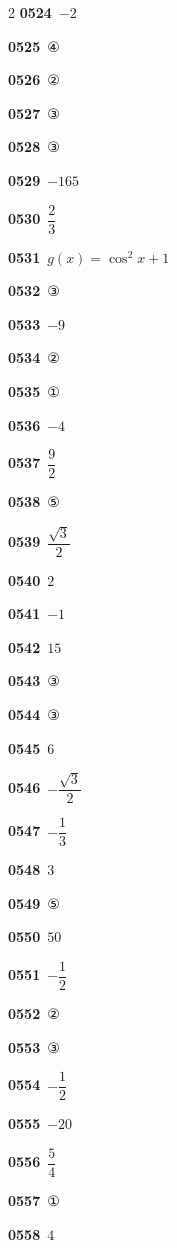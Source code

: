 \documentclass[10pt,a4paper]{article}
\begin{document}
\begin{multicols}{2}
\noindent\textbf{0524}\ $-2$\par
\noindent\textbf{0525}\ ④\par
\noindent\textbf{0526}\ ②\par
\noindent\textbf{0527}\ ③\par
\noindent\textbf{0528}\ ③\par
\noindent\textbf{0529}\ $-165$\par
\noindent\textbf{0530}\ $\dfrac{2}{3}$\par
\noindent\textbf{0531}\ $g(x)=\cos^2 x+1$\par
\noindent\textbf{0532}\ ③\par
\noindent\textbf{0533}\ $-9$\par
\noindent\textbf{0534}\ ②\par
\noindent\textbf{0535}\ ①\par
\noindent\textbf{0536}\ $-4$\par
\noindent\textbf{0537}\ $\dfrac{9}{2}$\par
\noindent\textbf{0538}\ ⑤\par
\noindent\textbf{0539}\ $\dfrac{\sqrt{3}}{2}$\par
\noindent\textbf{0540}\ $2$\par
\noindent\textbf{0541}\ $-1$\par
\noindent\textbf{0542}\ $15$\par
\noindent\textbf{0543}\ ③\par
\noindent\textbf{0544}\ ③\par
\noindent\textbf{0545}\ $6$\par
\noindent\textbf{0546}\ $-\dfrac{\sqrt{3}}{2}$\par
\noindent\textbf{0547}\ $-\dfrac{1}{3}$\par
\noindent\textbf{0548}\ $3$\par
\noindent\textbf{0549}\ ⑤\par
\noindent\textbf{0550}\ $50$\par
\noindent\textbf{0551}\ $-\dfrac{1}{2}$\par
\noindent\textbf{0552}\ ②\par
\noindent\textbf{0553}\ ③\par
\noindent\textbf{0554}\ $-\dfrac{1}{2}$\par
\noindent\textbf{0555}\ $-20$\par
\noindent\textbf{0556}\ $\dfrac{5}{4}$\par
\noindent\textbf{0557}\ ①\par
\noindent\textbf{0558}\ $4$\par

\end{multicols}
\end{document}
